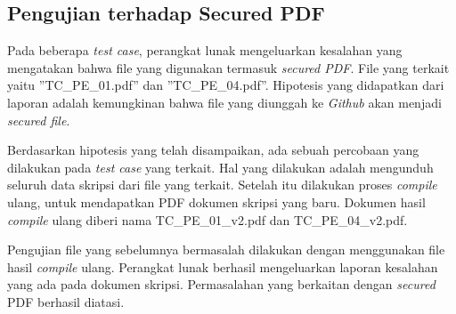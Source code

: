 \subsection{Pengujian terhadap Secured PDF}
Pada beberapa \textit{test case}, perangkat lunak mengeluarkan kesalahan yang mengatakan bahwa file yang digunakan termasuk \textit{secured PDF}. File yang terkait yaitu ''TC\_PE\_01.pdf'' dan ''TC\_PE\_04.pdf''. Hipotesis yang didapatkan dari laporan adalah kemungkinan bahwa file yang diunggah ke \textit{Github} akan menjadi \textit{secured file}.

Berdasarkan hipotesis yang telah disampaikan, ada sebuah percobaan yang dilakukan pada \textit{test case} yang terkait. Hal yang dilakukan adalah mengunduh seluruh data skripsi dari file yang terkait. Setelah itu dilakukan proses \textit{compile} ulang, untuk mendapatkan PDF dokumen skripsi yang baru. Dokumen hasil \textit{compile} ulang diberi nama TC\_PE\_01\_v2.pdf dan TC\_PE\_04\_v2.pdf. 

Pengujian file yang sebelumnya bermasalah dilakukan dengan menggunakan file hasil \textit{compile} ulang. Perangkat lunak berhasil mengeluarkan laporan kesalahan yang ada pada dokumen skripsi. Permasalahan yang berkaitan dengan \textit{secured} PDF berhasil diatasi.